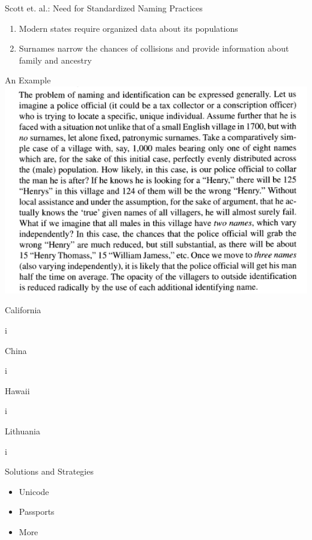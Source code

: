 \documentclass{beamer}
\begin{document}
\begin{frame}{Scott et. al.: Need for Standardized Naming Practices}
\begin{enumerate}
\item Modern states require organized data about its populations
\item Surnames narrow the chances of collisions and provide information about
family and ancestry
\end{enumerate}
\end{frame}

\begin{frame}{An Example}
\includegraphics[scale=0.4]{subtex/scott9.png}
\end{frame}

\begin{frame}{California}

i

\end{frame}

\begin{frame}{China}


i

\end{frame}

\begin{frame}{Hawaii}

i

\end{frame}

\begin{frame}{Lithuania}

i

\end{frame}

\begin{frame}{Solutions and Strategies}

\begin{itemize}
\item Unicode
\item Passports
\item More
\end{itemize}

\end{frame}
\end{document}
